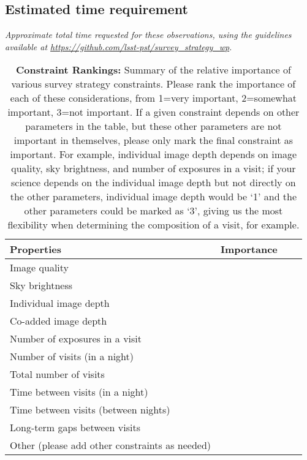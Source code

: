\documentclass[11pt]{article}
\begin{document}
\subsection{Estimated time requirement}
\begin{footnotesize}
{\it Approximate total time requested for these observations, using the guidelines available at \url{https://github.com/lsst-pst/survey_strategy_wp}.}
\end{footnotesize}

\vspace{.3in}

\begin{table}[ht]
    \centering
    \begin{tabular}{l|l|l|l}
        \toprule
        Properties & Importance \hspace{.3in} \\
        \midrule
        Image quality &     \\
        Sky brightness &  \\
        Individual image depth &   \\
        Co-added image depth &   \\
        Number of exposures in a visit   &   \\
        Number of visits (in a night)  &   \\ 
        Total number of visits &   \\
        Time between visits (in a night) &  \\
        Time between visits (between nights)  &   \\
        Long-term gaps between visits & \\
        Other (please add other constraints as needed) & \\
        \bottomrule
    \end{tabular}
    \caption{{\bf Constraint Rankings:} Summary of the relative importance of various survey strategy constraints. Please rank the importance of each of these considerations, from 1=very important, 2=somewhat important, 3=not important. If a given constraint depends on other parameters in the table, but these other parameters are not important in themselves, please only mark the final constraint as important. For example, individual image depth depends on image quality, sky brightness, and number of exposures in a visit; if your science depends on the individual image depth but not directly on the other parameters, individual image depth would be `1' and the other parameters could be marked as `3', giving us the most flexibility when determining the composition of a visit, for example.}
        \label{tab:obs_constraints}
\end{table}
\end{document}
